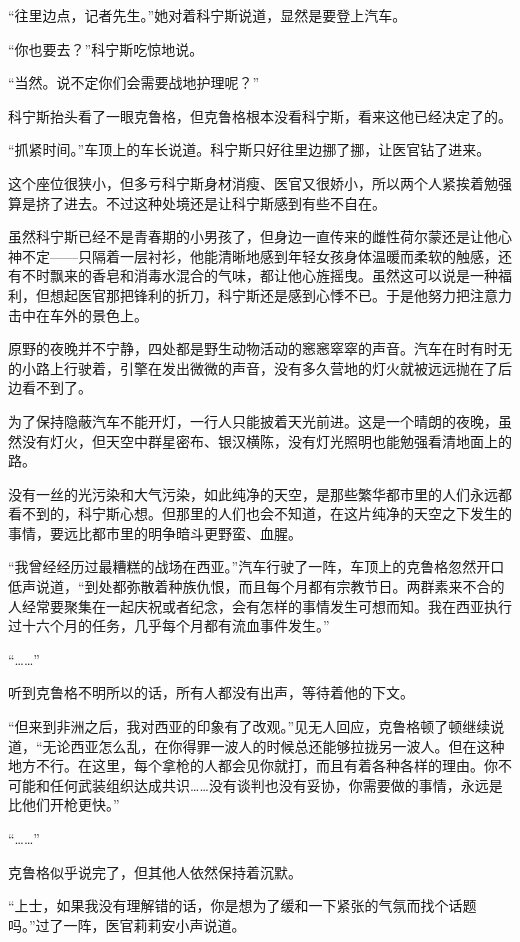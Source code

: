“往里边点，记者先生。”她对着科宁斯说道，显然是要登上汽车。

“你也要去？”科宁斯吃惊地说。

“当然。说不定你们会需要战地护理呢？”

科宁斯抬头看了一眼克鲁格，但克鲁格根本没看科宁斯，看来这他已经决定了的。

“抓紧时间。”车顶上的车长说道。科宁斯只好往里边挪了挪，让医官钻了进来。

这个座位很狭小，但多亏科宁斯身材消瘦、医官又很娇小，所以两个人紧挨着勉强算是挤了进去。不过这种处境还是让科宁斯感到有些不自在。

虽然科宁斯已经不是青春期的小男孩了，但身边一直传来的雌性荷尔蒙还是让他心神不定——只隔着一层衬衫，他能清晰地感到年轻女孩身体温暖而柔软的触感，还有不时飘来的香皂和消毒水混合的气味，都让他心旌摇曳。虽然这可以说是一种福利，但想起医官那把锋利的折刀，科宁斯还是感到心悸不已。于是他努力把注意力击中在车外的景色上。

原野的夜晚并不宁静，四处都是野生动物活动的窸窸窣窣的声音。汽车在时有时无的小路上行驶着，引擎在发出微微的声音，没有多久营地的灯火就被远远抛在了后边看不到了。

为了保持隐蔽汽车不能开灯，一行人只能披着天光前进。这是一个晴朗的夜晚，虽然没有灯火，但天空中群星密布、银汉横陈，没有灯光照明也能勉强看清地面上的路。

没有一丝的光污染和大气污染，如此纯净的天空，是那些繁华都市里的人们永远都看不到的，科宁斯心想。但那里的人们也会不知道，在这片纯净的天空之下发生的事情，要远比都市里的明争暗斗更野蛮、血腥。

“我曾经经历过最糟糕的战场在西亚。”汽车行驶了一阵，车顶上的克鲁格忽然开口低声说道，“到处都弥散着种族仇恨，而且每个月都有宗教节日。两群素来不合的人经常要聚集在一起庆祝或者纪念，会有怎样的事情发生可想而知。我在西亚执行过十六个月的任务，几乎每个月都有流血事件发生。”

“……”

听到克鲁格不明所以的话，所有人都没有出声，等待着他的下文。

“但来到非洲之后，我对西亚的印象有了改观。”见无人回应，克鲁格顿了顿继续说道，“无论西亚怎么乱，在你得罪一波人的时候总还能够拉拢另一波人。但在这种地方不行。在这里，每个拿枪的人都会见你就打，而且有着各种各样的理由。你不可能和任何武装组织达成共识……没有谈判也没有妥协，你需要做的事情，永远是比他们开枪更快。”

“……”

克鲁格似乎说完了，但其他人依然保持着沉默。

“上士，如果我没有理解错的话，你是想为了缓和一下紧张的气氛而找个话题吗。”过了一阵，医官莉莉安小声说道。

